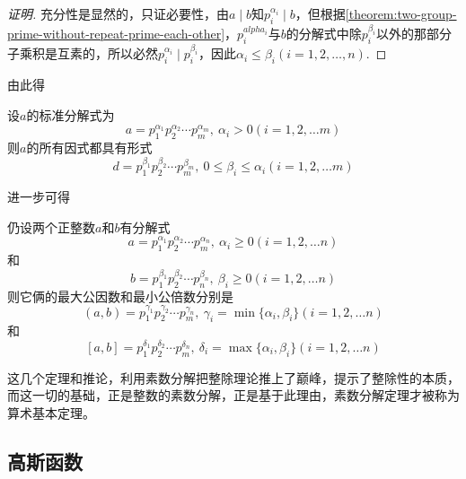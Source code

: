 \begin{proof}[证明]
  充分性是显然的，只证必要性，由$a \mid b$知$p_i^{\alpha_i} \mid b$，但根据\autoref{theorem:two-group-prime-without-repeat-prime-each-other}，$p_i^{alpha_i}$与$b$的分解式中除$p_i^{\beta_i}$以外的那部分子乘积是互素的，所以必然$p_i^{\alpha_i} \mid p_i^{\beta_i}$，因此$\alpha_i \leqslant \beta_i(i=1,2,\ldots,n)$.
\end{proof}

由此得
\begin{inference}
  设$a$的标准分解式为
\[ a = p_1^{\alpha_1}p_2^{\alpha_2} \cdots p_m^{\alpha_m}, \  \alpha_i > 0 (i=1,2,\ldots m) \]
则$a$的所有因式都具有形式
\[ d = p_1^{\beta_1}p_2^{\beta_2} \cdots p_m^{\beta_m}, \  0 \leqslant \beta_i \leqslant \alpha_i (i=1,2,\ldots m) \]
\end{inference}

进一步可得
\begin{theorem}
  仍设两个正整数$a$和$b$有分解式
\[ a = p_1^{\alpha_1}p_2^{\alpha_2} \cdots p_m^{\alpha_n}, \  \alpha_i \geqslant 0 (i=1,2,\ldots n) \]
和
\[ b = p_1^{\beta_1}p_2^{\beta_2} \cdots p_n^{\beta_n}, \  \beta_i \geqslant 0 (i=1,2,\ldots n) \]
则它俩的最大公因数和最小公倍数分别是
\[ (a,b) = p_1^{\gamma_1}p_2^{\gamma_2} \cdots p_m^{\gamma_n}, \  \gamma_i=\min\{\alpha_i,\beta_i\} (i=1,2,\ldots n) \]
和
\[ [a,b] = p_1^{\delta_1}p_2^{\delta_2} \cdots p_m^{\delta_n}, \  \delta_i=\max\{\alpha_i,\beta_i\} (i=1,2,\ldots n) \]
\end{theorem}

这几个定理和推论，利用素数分解把整除理论推上了巅峰，提示了整除性的本质，而这一切的基础，正是整数的素数分解，正是基于此理由，素数分解定理才被称为算术基本定理。

\subsection{高斯函数}
\label{sec:gauss-function}


